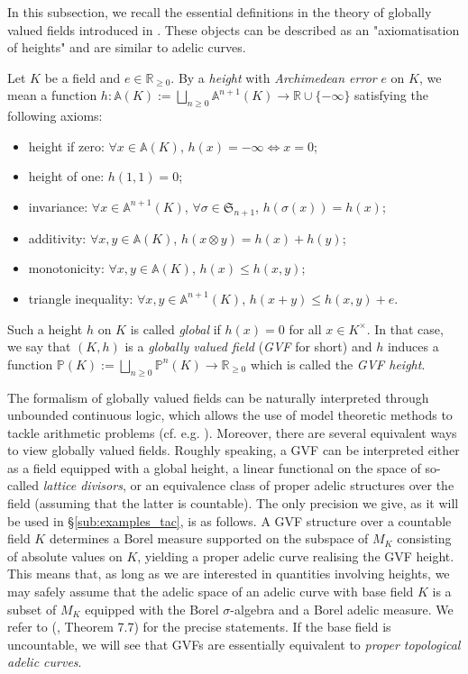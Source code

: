 \documentclass [11pt,reqno]{amsart}
\def\bR{{\mathbb{R}}}
\newcommand{\1}{\mathmybb{1}}
\begin{document}
In this subsection, we recall the essential definitions in the theory of globally valued fields introduced in \cite{GVF24}. These objects can be described as an "axiomatisation of heights" and are similar to adelic curves. 

Let $K$ be a field and $e\in \bR_{\geq 0}$. By a \emph{height} with \emph{Archimedean error} $e$ on $K$, we mean a function $h: \mathbb{A}(K):=\bigsqcup_{n\geq 0}\mathbb{A}^{n+1}(K) \to \bR\cup\{-\infty\}$ satisfying the following axioms:
\begin{itemize}
	\item height if zero: $\forall x\in \mathbb{A}(K)$, $h(x)=-\infty \Leftrightarrow x=0$;
	\item height of one: $h(1,1)=0$;
	\item invariance: $\forall x\in\mathbb{A}^{n+1}(K)$, $\forall \sigma\in \mathfrak{S}_{n+1}$, $h(\sigma(x))=h(x)$; 
	\item additivity: $\forall x,y\in \mathbb{A}(K)$, $h(x\otimes y)= h(x)+h(y)$;
	\item monotonicity: $\forall x,y\in \mathbb{A}(K)$, $h(x)\leq h(x,y)$;
	\item triangle inequality: $\forall x,y\in \mathbb{A}^{n+1}(K)$, $h(x+y)\leq h(x,y)+e$.
\end{itemize}
Such a height $h$ on $K$ is called \emph{global} if $h(x)=0$ for all $x\in K^{\times}$. In that case, we say that $(K,h)$ is a \emph{globally valued field} (\emph{GVF} for short) and $h$ induces a function $\mathbb{P}(K):=\bigsqcup_{n\geq 0}\mathbb{P}^{n}(K)\to \bR_{\geq 0}$ which is called the \emph{GVF height}.

The formalism of globally valued fields can be naturally interpreted through unbounded continuous logic, which allows the use of model theoretic methods to tackle arithmetic problems (cf. e.g. \cite{DHS24}). Moreover, there are several equivalent ways to view globally valued fields. Roughly speaking, a GVF can be interpreted either as a field equipped with a global height, a linear functional on the space of so-called \emph{lattice divisors}, or an equivalence class of proper adelic structures over the field (assuming that the latter is countable). The only precision we give, as it will be used in \S \ref{sub:examples_tac}, is as follows. A GVF structure over a countable field $K$ determines a Borel measure supported on the subspace of $M_{K}$ consisting of absolute values on $K$, yielding a proper adelic curve realising the GVF height. This means that, as long as we are interested in quantities involving heights, we may safely assume that the adelic space of an adelic curve with base field $K$ is a subset of $M_{K}$ equipped with the Borel $\sigma$-algebra and a Borel adelic measure. We refer to (\cite{GVF24}, Theorem 7.7) for the precise statements. If the base field is uncountable, we will see that GVFs are essentially equivalent to \emph{proper topological adelic curves}. 
\end{document}
